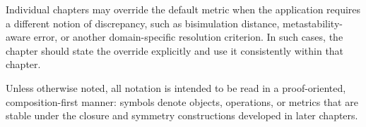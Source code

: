 \documentclass[11pt]{article}
\begin{document}
Individual chapters may override the default metric when the application requires a different notion of discrepancy, such as bisimulation distance, metastability-aware error, or another domain-specific resolution criterion. In such cases, the chapter should state the override explicitly and use it consistently within that chapter.

Unless otherwise noted, all notation is intended to be read in a proof-oriented, composition-first manner: symbols denote objects, operations, or metrics that are stable under the closure and symmetry constructions developed in later chapters.
\end{document}
